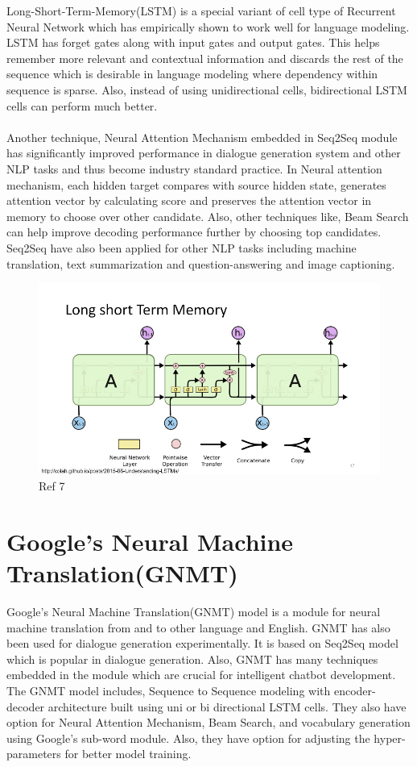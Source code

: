 \documentclass[a4paper,12pt]{report}
\begin{document}
\noindent Long-Short-Term-Memory(LSTM) is a special variant of cell type of Recurrent Neural Network which has empirically shown to work well for language modeling. LSTM has forget gates along with input gates and output gates. This helps remember more relevant and contextual information and discards the rest of the sequence which is desirable in language modeling where dependency within sequence is sparse. Also, instead of using unidirectional cells, bidirectional LSTM cells can perform much better.\\\\
Another technique, Neural Attention Mechanism embedded in Seq2Seq module has significantly improved performance in dialogue generation system and other NLP tasks and thus become industry standard practice. In Neural attention mechanism, each hidden target compares with source hidden state, generates attention vector by calculating score and preserves the attention vector in memory to choose over other candidate. Also, other techniques like, Beam Search can help improve decoding performance further by choosing top candidates. Seq2Seq have also been applied for other NLP tasks including machine translation, text summarization and question-answering and image captioning.
\begin{figure}[H]
\begin{center}
\includegraphics[scale=.4]{lstm}
\caption{Ref 7}
\end{center}
\end{figure} 
\section{Google's Neural Machine Translation(GNMT)}
Google's Neural Machine Translation(GNMT) model is a module for neural machine translation from and to other language and English. GNMT has also been used for dialogue generation experimentally. It is based on Seq2Seq model which is popular in dialogue generation. Also, GNMT has many techniques embedded in the module which are crucial for intelligent chatbot development. The GNMT model includes, Sequence to Sequence modeling with encoder-decoder architecture built using uni or bi directional LSTM cells. They also have option for Neural Attention Mechanism, Beam Search, and vocabulary generation using Google's sub-word module. Also, they have option for adjusting the hyper-parameters for better model training.
\end{document}
